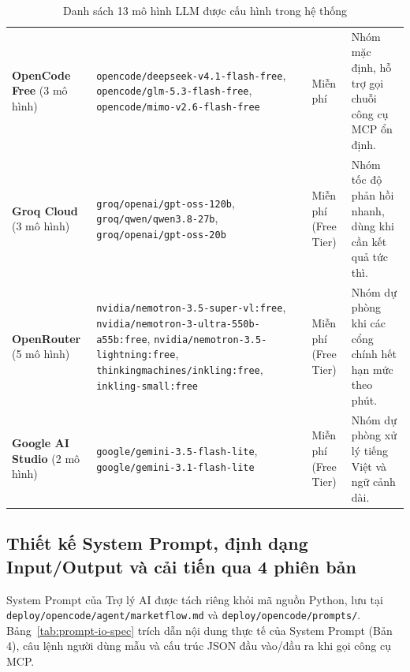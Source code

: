 \begin{table}[!htbp]
\centering
\scriptsize
\renewcommand{\arraystretch}{1.04}
\caption{Danh sách 13 mô hình LLM được cấu hình trong hệ thống}
\label{tab:cost-table}
\begin{tabularx}{\textwidth}{|L{2.6cm}|L{5.5cm}|C{1.8cm}|Y|}
\hline
{} &  &  & \\
\hline
\textbf{OpenCode Free} (3 mô hình) & \texttt{opencode/deepseek-v4.1-flash-free}, \texttt{opencode/glm-5.3-flash-free}, \texttt{opencode/mimo-v2.6-flash-free} & Miễn phí & Nhóm mặc định, hỗ trợ gọi chuỗi công cụ MCP ổn định.\\
\hline
\textbf{Groq Cloud} (3 mô hình) & \texttt{groq/openai/gpt-oss-120b}, \texttt{groq/qwen/qwen3.8-27b}, \texttt{groq/openai/gpt-oss-20b} & Miễn phí (Free Tier) & Nhóm tốc độ phản hồi nhanh, dùng khi cần kết quả tức thì.\\
\hline
\textbf{OpenRouter} (5 mô hình) & \texttt{nvidia/nemotron-3.5-super-vl:free}, \texttt{nvidia/nemotron-3-ultra-550b-a55b:free}, \texttt{nvidia/nemotron-3.5-lightning:free}, \texttt{thinkingmachines/inkling:free}, \texttt{inkling-small:free} & Miễn phí (Free Tier) & Nhóm dự phòng khi các cổng chính hết hạn mức theo phút.\\
\hline
\textbf{Google AI Studio} (2 mô hình) & \texttt{google/gemini-3.5-flash-lite}, \texttt{google/gemini-3.1-flash-lite} & Miễn phí (Free Tier) & Nhóm dự phòng xử lý tiếng Việt và ngữ cảnh dài.\\
\hline
\end{tabularx}
\end{table}

\subsection{Thiết kế System Prompt, định dạng Input/Output và cải tiến qua 4 phiên bản}

System Prompt của Trợ lý AI được tách riêng khỏi mã nguồn Python, lưu tại \texttt{deploy/opencode/\allowbreak agent/marketflow.md} và \texttt{deploy/opencode/prompts/}. Bảng~\ref{tab:prompt-io-spec} trích dẫn nội dung thực tế của System Prompt (Bản 4), câu lệnh người dùng mẫu và cấu trúc JSON đầu vào/đầu ra khi gọi công cụ MCP.

